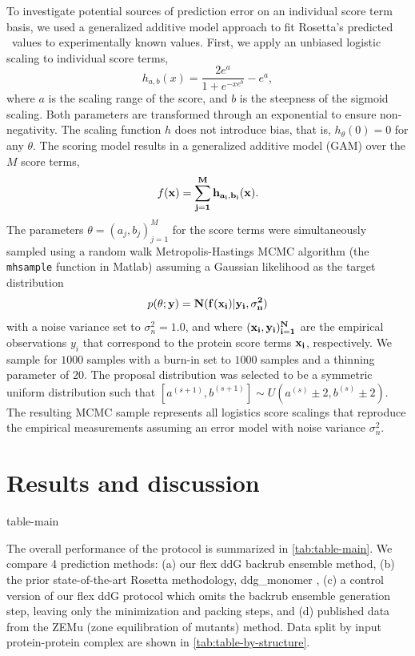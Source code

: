 To investigate potential sources of prediction error on an individual score term basis, we used a generalized additive model\cite{hastie_generalized_1990} approach to fit Rosetta's predicted \ddg\ values to experimentally known values.
First, we apply an unbiased logistic scaling to individual score terms,
$$h_{a,b}(x) = \frac{2e^{a}}{1 + e^{-xe^{b}}}-e^a,$$
where $a$ is the scaling range of the score, and $b$ is the steepness of the sigmoid scaling. Both parameters are transformed through an exponential to ensure non-negativity. The scaling function $h$ does not introduce bias, that is, $h_\theta(0) = 0$ for any $\theta$. The scoring model results in a generalized additive model (GAM) over the $M$ score terms,
$$f(\bf{x}) = \sum_{j=1}^M h_{a_i,b_i}(x).$$
The parameters $\theta = (a_j,b_j)_{j=1}^M$ for the score terms were simultaneously sampled using a random walk Metropolis-Hastings MCMC algorithm (the \texttt{mhsample} function in Matlab) assuming a Gaussian likelihood as the target distribution
$$p(\theta ; \bf{y}) = N( f(\bf{x}_i) | y_i, \sigma_n^2)$$
with a noise variance set to $\sigma_n^2 = 1.0$, and where $(\bf{x}_i,y_i)_{i=1}^N$ are the empirical observations $y_i$ that correspond to the protein score terms $\bf{x}_i$, respectively. We sample for $1000$ samples with a burn-in set to $1000$ samples and a thinning parameter of $20$. The proposal distribution was selected to be a symmetric uniform distribution such that $[a^{(s+1)},b^{(s+1)}] \sim U( a^{(s)} \pm 2, b^{(s)} \pm 2)$. The resulting MCMC sample represents all logistics score scalings that reproduce the empirical measurements assuming an error model with noise variance $\sigma_n^2$.

\section{Results and discussion}

{table-main}

The overall performance of the protocol is summarized in \cref{tab:table-main}.
We compare 4 prediction methods: (a) our flex ddG backrub ensemble method, (b) the prior state-of-the-art Rosetta methodology, ddg\_monomer \cite{kellogg_role_2011}, (c) a control version of our flex ddG protocol which omits the backrub ensemble generation step, leaving only the minimization and packing steps, and (d) published data from the ZEMu (zone equilibration of mutants) method\cite{dourado_multiscale_2014}. Data split by input protein-protein complex are shown in \cref{tab:table-by-structure}.

